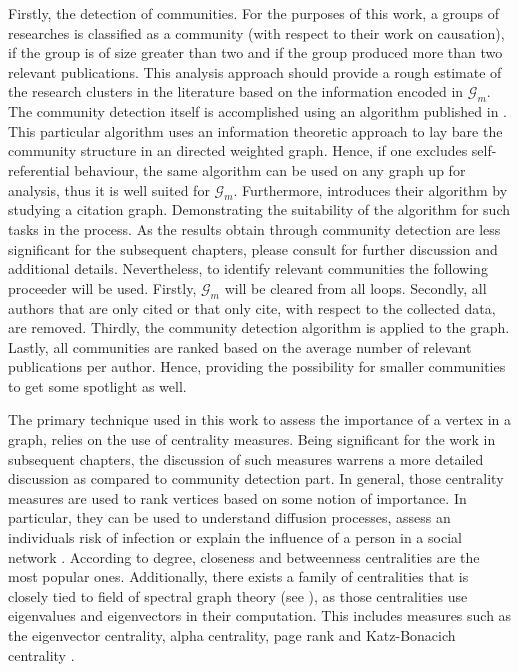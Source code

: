 \documentclass[11pt,a4paper]{book}
\theoremstyle{definition}
\theoremstyle{definition}
\theoremstyle{definition}
\theoremstyle{remark}
\newcommand{\acgraph}{\mathcal{G}_{m}}
\begin{document}
Firstly, the detection of communities. For the purposes of this work, a groups of researches is classified as a community (with respect to their work on causation), if the group is of size greater than two and if the group produced more than two relevant publications. This analysis approach should provide a rough estimate of the research clusters in the literature based on the information encoded in $\acgraph$. 
The community detection itself is accomplished using an algorithm published in \parencite{rosvall2008maps}. 
This particular algorithm uses an information theoretic approach to lay bare the community structure in an directed weighted graph.
Hence, if one excludes self-referential behaviour, the same algorithm can be used on any graph up for analysis, thus it is well suited for $\acgraph$. Furthermore, \parencite{rosvall2008maps} introduces their algorithm by studying a citation graph.
Demonstrating the suitability of the algorithm for such tasks in the process. As the results obtain through community detection are less significant for the subsequent chapters, please consult \parencite{rosvall2008maps} for further discussion and additional details. 
Nevertheless, to identify relevant communities the following proceeder will be used. 
Firstly, $\acgraph$ will be cleared from all loops. Secondly, all authors that are only cited or that only cite, with respect to the collected data, are removed. 
Thirdly, the community detection algorithm is applied to the graph. Lastly, all communities are ranked based on the average number of relevant publications per author. Hence, providing the possibility for smaller communities to get some spotlight as well.


The primary technique used in this work to assess the importance of a vertex in a graph, relies on the use of centrality measures. Being significant for the work in subsequent chapters, the discussion of such measures warrens a more detailed discussion as compared to community detection part. In general, those centrality measures are used to rank vertices based on some notion of importance. In particular, they can be used to understand diffusion processes, assess an individuals risk of infection or explain the influence of a 
person in a social network \parencite{bloch2019centrality}. According to \parencite{del2011centrality} degree, closeness and betweenness centralities are the most popular ones. Additionally, there exists a family of centralities that is closely tied to field of spectral graph theory (see \parencite{spielman2012spectral}), as those centralities use eigenvalues and eigenvectors in their computation. This includes measures such as the eigenvector centrality, alpha centrality, page rank and Katz-Bonacich centrality  \parencite{bloch2019centrality}. 
\end{document}
